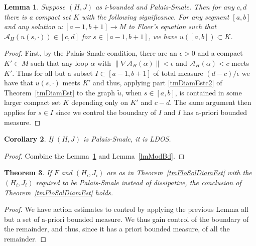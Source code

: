 \documentclass[11pt]{amsart}
\newtheorem{tm}{Theorem}[section]
\newtheorem{lm}[tm]{Lemma}
\newtheorem{cy}[tm]{Corollary}
\theoremstyle{definition}
\theoremstyle{remark}
\begin{document}
\begin{lm}\label{lmPalSmDis}
Suppose $(H,J)$ as i-bounded and Palais-Smale. Then for any $c,d$  there is a compact set $K$ with the following significance. For any segment $[a,b]$ and any solution $u:[a-1,b+1]\to M$ to Floer's equation such that $\mathcal{A}_H(u(s,\cdot))\in[c,d]$ for $s\in [a-1,b+1]$, we have $u([a,b])\subset K$.
\end{lm}
\begin{proof}
First, by the Palais-Smale condition, there are an $\epsilon>0$  and a compact $K'\subset M$ such that any loop $\alpha$ with $\|\nabla\mathcal{A}_H(\alpha)\|<\epsilon$ and $\mathcal{A}_H(\alpha)<c$ meets $K'$. Thus for all but a subset $I\subset[a-1,b+1]$ of total measure $(d-c)/\epsilon$ we have that $u(s,\cdot)$ meets $K'$ and thus, applying part \ref{tmDiamEstc2} of Theorem~\ref{tmDiamEst} to the graph $\tilde{u}$, when $s\in [a,b]$, is contained  in some larger compact set $K$ depending only on $K'$ and $c-d$. The same argument then applies for $s\in I$ since we control the boundary of $I$ and $I$ has a-priori bounded measure.
\end{proof}
\begin{cy}
If $(H,J)$ is Palais-Smale, it is LDOS.
\end{cy}
\begin{proof}
Combine the Lemma~\ref{lmPalSmDis} and Lemma~\ref{lmModBd}.
\end{proof}
\begin{tm}
If $F$ and $(H_i,J_i)$ are as in Theorem~\ref{tmFloSolDiamEst} with the $(H_i,J_i)$ required to be Palais-Smale instead of dissipative, the conclusion of Theorem~\ref{tmFloSolDiamEst} holds.
\end{tm}
\begin{proof}
We have action estimates to control by applying the previous Lemma all but a set of a-priori bounded measure. We thus gain control of the boundary of the remainder, and thus, since it has a priori bounded measure, of all the remainder.
\end{proof}
\end{document}

